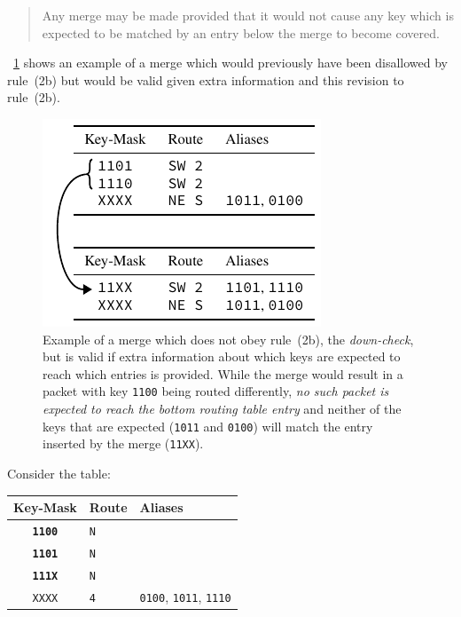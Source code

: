\documentclass[conference]{IEEEtran}
\newcommand{\mytt}[1]{\texttt{\footnotesize#1}}
\begin{document}
  \begin{quote}
    Any merge may be made provided that it would not cause any key which is expected to be matched by an entry below the merge to become covered.
  \end{quote}

  \figurename~\ref{fig:algorithm/rule2b'_example} shows an example of a merge which would previously have been disallowed by rule~(2b) but would be valid given extra information and this revision to rule~(2b).

  \begin{figure}[!b]
    \centering
    \includegraphics{figures/aliases_example}
    \caption{
      Example of a merge which does not obey rule~(2b), the \textit{down-check}, but is valid if extra information about which keys are expected to reach which entries is provided.
      While the merge would result in a packet with key \mytt{1100} being routed differently, \textit{no such packet is expected to reach the bottom routing table entry} and neither of the keys that are expected (\mytt{1011} and \mytt{0100}) will match the entry inserted by the merge (\mytt{11XX}).
    }
    \label{fig:algorithm/rule2b'_example}
  \end{figure}

  Consider the table:

  \begin{table}[H]
    \centering
    \begin{tabular}{c l l}
      \toprule
      Key-Mask & Route & Aliases \\
      \midrule
      \textbf{\texttt{1100}} & \texttt{N} \\
      \textbf{\texttt{1101}} & \texttt{N} \\
      \textbf{\texttt{111X}} & \texttt{N} \\
      \texttt{XXXX} & \texttt{4} & \texttt{0100}, \texttt{1011}, \texttt{1110} \\
      \bottomrule
    \end{tabular}
  \end{table}
\end{document}
